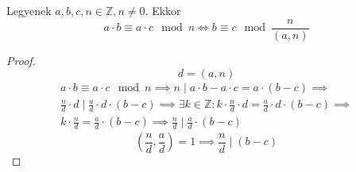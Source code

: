 \begin{theorem}
	Legyenek $a, b, c, n \in \mathbb{Z}, n \neq 0$. Ekkor
	\begin{equation*}
		a \cdot b \equiv a \cdot c \mod n \iff b \equiv c \mod \frac{n}{(a, n)}
	\end{equation*}
\end{theorem}
\begin{proof}
	\begin{equation*}
		d = (a, n)
	\end{equation*}
	\begin{multline*}
		a \cdot b \equiv a \cdot c \mod n \implies
		n \mid a \cdot b - a \cdot c = a \cdot (b - c) \implies \\
		\frac{n}{d} \cdot d \mid
		\frac{a}{d} \cdot d \cdot (b - c) \implies
		\exists k \in \mathbb{Z}: k \cdot \frac{n}{d} \cdot d =
		\frac{a}{d} \cdot d \cdot (b - c) \implies \\
		k \cdot \frac{n}{d} = \frac{a}{d} \cdot (b - c) \implies
		\frac{n}{d} \mid \frac{a}{d} \cdot (b - c)
	\end{multline*}
	\begin{equation*}
		\left(\frac{n}{d}, \frac{a}{d}\right) = 1 \implies
		\frac{n}{d} \mid (b - c)
	\end{equation*}
\end{proof}
